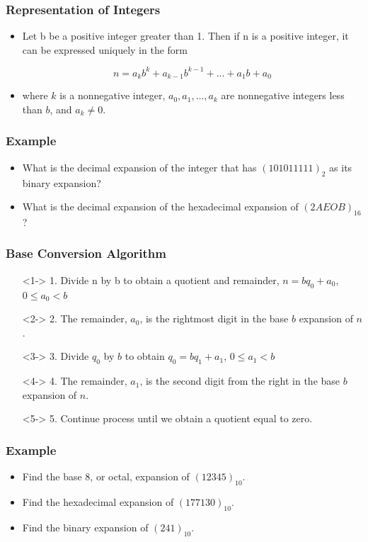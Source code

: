 \documentclass{beamer}
\begin{document}
\begin{frame}
\frametitle{\huge Representation of Integers}
\Large
\begin{itemize} 
\item <1-> Let b be a positive integer greater than 1. Then if n is a positive integer, it can be expressed uniquely in the form 

\[n = {a_k}{b^k} + {a_{k - 1}}{b^{k - 1}} + ... + {a_1}b + {a_0}\] 

\item<2-> where $k$ is a nonnegative integer, $a_0 , a_1, \ldots , a_k$ are nonnegative integers less than $b$, and
$a_k \ne 0$.
\end{itemize}
 \end{frame}


\begin{frame}
\frametitle{\huge Example}
\Large
\begin{itemize} 
\item <1-> What is the decimal expansion of the integer that has $( 1 0101 1111)_2$ as its binary expansion?
\item <2-> What is the decimal expansion of the hexadecimal expansion of $(2AEOB)_{16}$?
\end{itemize}
 \end{frame}


\begin{frame}
\frametitle{\huge Base Conversion Algorithm}
\Large 
\begin{itemize} 
\item[] <1->  1. Divide n by b to obtain a quotient and remainder, $n = b{q_0} + {a_0}$,    $0 \le {a_0} < b $ \\
\item[] <2->   2. The remainder, $a_0$, is the rightmost digit in the base $b$ expansion of $n$. \\
\item[] <3->   3. Divide $q_0$ by $b$ to obtain $ {q_0} = b{q_1} + {a_1}$,  $  0 \le {a_1} < b $ \\
 \item[] <4->  4. The remainder, $a_1$, is the second digit from the right in the base $b$ expansion of $n$. \\
 \item[] <5->  5. Continue process until we obtain a quotient equal to zero.\\
\end{itemize}
 \end{frame}


\begin{frame}
\frametitle{\huge Example}
\Large
\begin{itemize} 
\item <1-> Find the base $8$, or octal, expansion of $(12345)_10$.
\item <2-> Find the hexadecimal expansion of $(177130)_10$.
\item <3-> Find the binary expansion of $(241)_10$.
\end{itemize}
 \end{frame}
\end{document}
